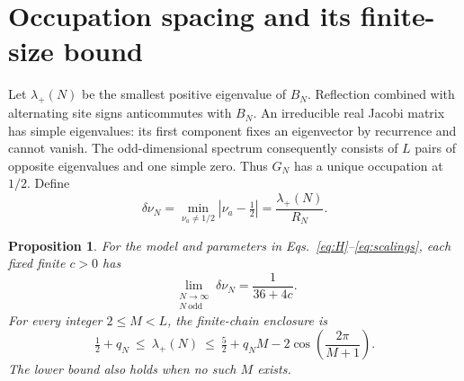 \documentclass[11pt,a4paper]{article}
\newtheorem{proposition}{Proposition}
\begin{document}
\section{Occupation spacing and its finite-size bound}
Let $\lambda_+(N)$ be the smallest positive eigenvalue of $B_N$.
Reflection combined with alternating site signs anticommutes with
$B_N$. An irreducible real Jacobi matrix has simple eigenvalues: its
first component fixes an eigenvector by recurrence and cannot vanish.
The odd-dimensional spectrum consequently consists of $L$ pairs of
opposite eigenvalues and one simple zero. Thus $G_N$ has a unique
occupation at $1/2$. Define
\begin{equation}
 \delta\nu_N=\min_{\nu_a\ne1/2}|\nu_a-\tfrac12|
            =\frac{\lambda_+(N)}{R_N}.
 \label{eq:gapdef}
\end{equation}

\begin{proposition}
For the model and parameters in Eqs.~\eqref{eq:H}--\eqref{eq:scalings},
each fixed finite $c>0$ has
\begin{equation}
 \lim_{\substack{N\to\infty\\N\ \mathrm{odd}}}\delta\nu_N
       =\frac{1}{36+4c}.
 \label{eq:gaplimit}
\end{equation}
For every integer $2\le M<L$, the finite-chain enclosure is
\begin{equation}
 \tfrac12+q_N\ \le\ \lambda_+(N)\ \le\
 \tfrac52+q_NM-2\cos\!\left(\frac{2\pi}{M+1}\right).
 \label{eq:gapbound}
\end{equation}
The lower bound also holds when no such $M$ exists.
\end{proposition}
\end{document}
